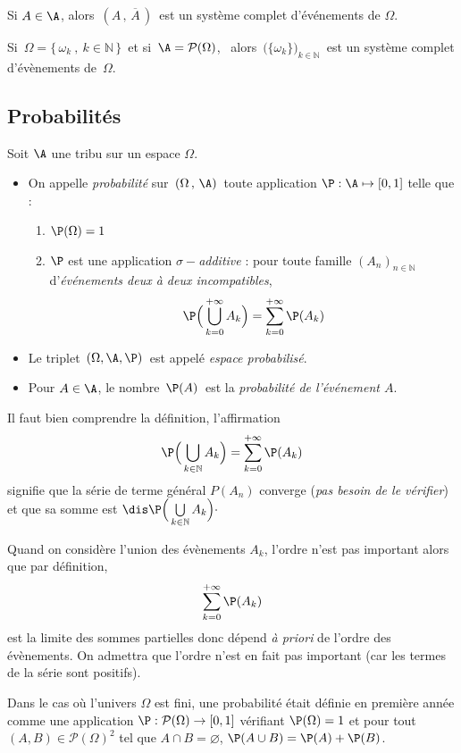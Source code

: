 \documentclass[a4paper,10pt]{report}
\begin{document}
\begin{exems}
\item Si $A\in \A$, alors $\,(A\,,\,\overline A\,)\,$ est un système complet d'événements de $\Omega$.
\item Si $\,\Omega = \{\,\omega _k\ , \ k\in  \mathbb N\,\}\,$ et si $\,\A = \mathcal P(\Omega )$, \ 
alors $\,\big(\{\omega _k\}\big) _{k\in \mathbb N}\,$ est un système complet d'évènements de $\,\Omega$.
\end{exems}

\subsection{Probabilités}

\begin{defin}[Probabilité]
\noindent Soit $\A$ une tribu sur un espace $\Omega$. 

\begin{itemize}
\item On appelle \textit{probabilité} sur $\,(\Omega\,,\,\A)\,$ toute application $\P : \A \mapsto [0,1]$ telle que : 
\begin{enumerate}
\item $\P(\Omega )=1$
\item $\P$ est une application \textit{$\sigma -$additive} : pour toute famille $(A_n)_{n\in \mathbb N}$ d'\textit{événements deux à deux incompatibles}, 
\[ \P\Big(\bigcup\limits_{k=0}^{+ \infty} A_k\Big) = \sum\limits_{k=0}^{+\infty } \P(A_k)  \]
\end{enumerate}
\item Le triplet $\,(\Omega , \A , \P)\,$ est appelé \textit{espace probabilisé}. 
\item Pour $A\in\A$, le nombre $\,\P(A)\,$ est la \textit{probabilité de l'événement $A$}.
\end{itemize} 
\end{defin}

\begin{rems} 
\item Il faut bien comprendre  la définition, l'affirmation 
\[  \P\Big(\bigcup\limits_{k\in \mathbb N} A_k\Big) = \sum\limits_{k=0}^{+\infty } \P(A_k) \]
signifie que la série de terme général $P(A_n)$ converge (\textit{pas besoin de le vérifier}) et que sa somme est $\dis \P\Big(\bigcup\limits_{k\in \mathbb N} A_k\Big) \cdot$
\item Quand on considère l'union des évènements $A_k$, l'ordre n'est pas important alors que par définition,
$$ \sum\limits_{k=0}^{+\infty } \P(A_k)$$
est la limite des sommes partielles donc dépend \textit{à priori} de l'ordre des évènements. On admettra que l'ordre n'est en fait pas important (car les termes de la série sont positifs).
\item Dans le cas où l'univers $\Omega$ est fini, une probabilité était définie en première année comme une application $\P : \mathcal{P}(\Omega) \rightarrow [0,1]$ vérifiant $\P(\Omega)=1$ et pour tout $(A,B) \in \mathcal{P}(\Omega)^2$ tel que $A \cap B=\varnothing$, $\P(A \cup B)=\P(A)+\P(B)$.
\end{rems}
\end{document}
